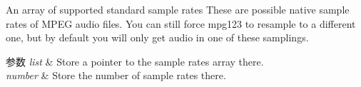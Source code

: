 An array of supported standard sample rates These are possible native sample rates of M\+P\+EG audio files. You can still force mpg123 to resample to a different one, but by default you will only get audio in one of these samplings. 
\begin{DoxyParams}{参数}
{\em list} & Store a pointer to the sample rates array there. \\
\hline
{\em number} & Store the number of sample rates there. \\
\hline
\end{DoxyParams}
